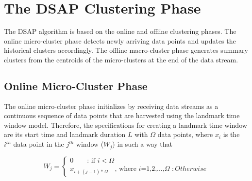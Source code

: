 




\section{The DSAP Clustering Phase}
The DSAP algorithm is based on the online and offline clustering phases. The online micro-cluster phase detects newly arriving data points and updates the historical clusters accordingly. The offline macro-cluster phase generates summary clusters from the centroids of the micro-clusters at the end of the data stream. 




\subsection{Online Micro-Cluster Phase}

 The online micro-cluster phase initializes by receiving data streams as a continuous sequence of data points that are harvested using the landmark time window model. Therefore, the specifications for creating a landmark time window are its start time and landmark duration $L$ with $\Omega$ data points, where
 $x_i$ is the $i^{th}$ data point in the $j^{th}$ window ($W_j$) in such a way that
 
  \begin{equation}
W_j = \begin{cases}
    0 \quad \phantom{\infty}\text{: if}\,\, i < \Omega  \\
    x_{i+(j-1)*\Omega} \quad \phantom{}  \text{, where $i$=1,2,...,$\Omega$}\,\, :Otherwise  \label{landmarkcal}
      \end{cases}
    \end{equation} 
 
